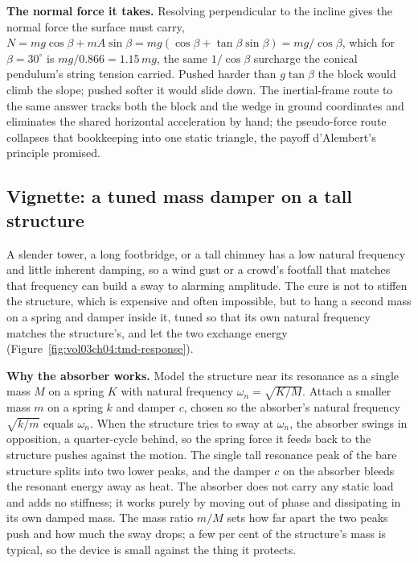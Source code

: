 \textbf{The normal force it takes.} Resolving perpendicular to the
incline gives the normal force the surface must carry,
$N=mg\cos\beta+mA\sin\beta=m g(\cos\beta+\tan\beta\sin\beta)=mg/\cos
\beta$, which for $\beta=30^{\circ}$ is $mg/0.866=1.15\,mg$, the same
$1/\cos\beta$ surcharge the conical pendulum's string tension carried.
Pushed harder than $g\tan\beta$ the block would climb the slope; pushed
softer it would slide down. The inertial-frame route to the same answer
tracks both the block and the wedge in ground coordinates and eliminates
the shared horizontal acceleration by hand; the pseudo-force route
collapses that bookkeeping into one static triangle, the payoff
d'Alembert's principle promised.







\subsection{Vignette: a tuned mass damper on a tall structure}

 A slender tower, a long footbridge, or a tall
chimney has a low natural frequency and little inherent damping, so a
wind gust or a crowd's footfall that matches that frequency can build a
sway to alarming amplitude. The cure is not to stiffen the structure,
which is expensive and often impossible, but to hang a second mass on a
spring and damper inside it, tuned so that its own natural frequency
matches the structure's, and let the two exchange energy
(Figure~\ref{fig:vol03ch04:tmd-response}).

\textbf{Why the absorber works.} Model the structure near its resonance
as a single mass $M$ on a spring $K$ with natural frequency
$\omega_{n}=\sqrt{K/M}$. Attach a smaller mass $m$ on a spring $k$ and
damper $c$, chosen so the absorber's natural frequency $\sqrt{k/m}$
equals $\omega_{n}$. When the structure tries to sway at $\omega_{n}$,
the absorber swings in opposition, a quarter-cycle behind, so the spring
force it feeds back to the structure pushes against the motion. The
single tall resonance peak of the bare structure splits into two lower
peaks, and the damper $c$ on the absorber bleeds the resonant energy
away as heat. The absorber does not carry any static load and adds no
stiffness; it works purely by moving out of phase and dissipating in its
own damped mass. The mass ratio $m/M$ sets how far apart the two peaks
push and how much the sway drops; a few per cent of the structure's mass
is typical, so the device is small against the thing it protects.

